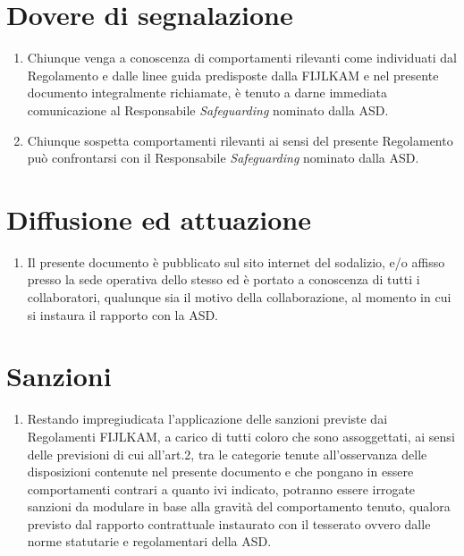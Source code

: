 \documentclass{djtsasddoc}
\begin{document}
	\section{Dovere di segnalazione}
	\begin{enumerate}
		\item Chiunque venga a conoscenza di comportamenti rilevanti come individuati dal Regolamento e dalle linee guida predisposte dalla FIJLKAM e nel presente documento integralmente richiamate, è tenuto a darne immediata comunicazione al Responsabile \textit{Safeguarding} nominato dalla ASD.
		\item Chiunque sospetta comportamenti rilevanti ai sensi del presente Regolamento può confrontarsi con il Responsabile \textit{Safeguarding} nominato dalla ASD.
	\end{enumerate}
	
	\section{Diffusione ed attuazione}
	\begin{enumerate}
		\item Il presente documento è pubblicato sul sito internet del sodalizio, e/o affisso presso la sede operativa dello stesso ed è portato a conoscenza di tutti i collaboratori, qualunque sia il motivo della collaborazione, al momento in cui si instaura il rapporto con la ASD.
	\end{enumerate}
	
	\section{Sanzioni}
	\begin{enumerate}
		\item Restando impregiudicata l'applicazione delle sanzioni previste dai Regolamenti FIJLKAM, a carico di tutti coloro che sono assoggettati, ai sensi delle previsioni di cui all'art.2, tra le categorie tenute all'osservanza delle disposizioni contenute nel presente documento e che pongano in essere comportamenti contrari a quanto ivi indicato, potranno essere irrogate sanzioni da modulare in base alla gravità del comportamento tenuto, qualora previsto dal rapporto contrattuale instaurato con il tesserato ovvero dalle norme statutarie e regolamentari della ASD.
	\end{enumerate}
	
\end{document}

